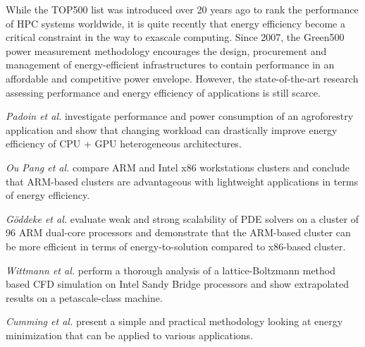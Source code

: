 While the  TOP500 list was  introduced over 20  years ago to  rank the
performance of HPC systems worldwide, it is quite recently that energy
efficiency  become  a  critical  constraint  in the  way  to  exascale
computing.   Since 2007,  the Green500  power  measurement methodology
encourages the design,  procurement and management of energy-efficient
infrastructures   to  contain   performance  in   an   affordable  and
competitive  power envelope.   However, the  state-of-the-art research
assessing performance  and energy efficiency of  applications is still
scarce.

\emph{Padoin et al.}   \cite{Padoin-2013} investigate performance and
power  consumption  of  an  agroforestry  application  and  show  that
changing workload  can drastically improve energy efficiency  of CPU +
GPU heterogeneous architectures.

\emph{Ou  Pang et  al.}   \cite{Ou-2012} compare  ARM  and Intel  x86
workstations  clusters  and   conclude  that  ARM-based  clusters  are
advantageous  with   lightweight  applications  in   terms  of  energy
efficiency.

\emph{G\"oddeke et al.}  \cite{Goddeke-2013} evaluate weak and strong
scalability of PDE solvers on a cluster of 96 ARM dual-core processors
and demonstrate  that the ARM-based  cluster can be more  efficient in
terms of energy-to-solution compared to x86-based cluster.

\emph{Wittmann  et  al.}   \cite{Wittmann-2013}  perform  a  thorough
analysis of  a lattice-Boltzmann method based CFD  simulation on Intel
Sandy   Bridge  processors   and  show   extrapolated  results   on  a
petascale-class machine.

\emph{Cumming  et  al.}  \cite{Cumming-2014}  present  a simple  and
practical  methodology  looking at  energy  minimization  that can  be
applied to various applications.
